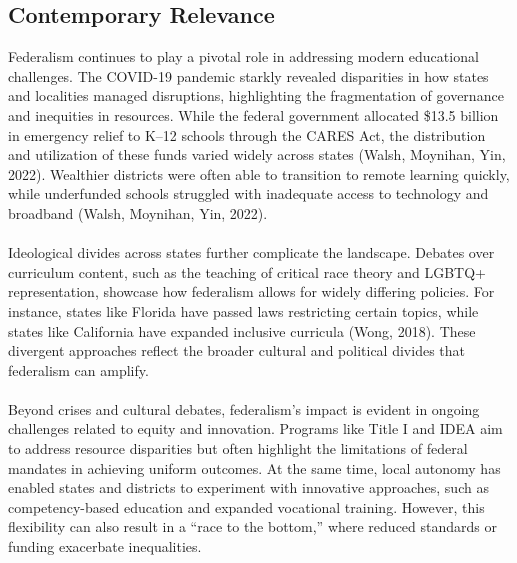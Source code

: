\documentclass[11pt]{extarticle}
\begin{document}
\subsection{Contemporary Relevance}
Federalism continues to play a pivotal role in addressing modern educational challenges. The COVID-19 pandemic starkly revealed disparities in how states and localities managed disruptions, highlighting the fragmentation of governance and inequities in resources. While the federal government allocated \$13.5 billion in emergency relief to K–12 schools through the CARES Act, the distribution and utilization of these funds varied widely across states (Walsh, Moynihan, Yin, 2022). Wealthier districts were often able to transition to remote learning quickly, while underfunded schools struggled with inadequate access to technology and broadband (Walsh, Moynihan, Yin, 2022).\\
\\
Ideological divides across states further complicate the landscape. Debates over curriculum content, such as the teaching of critical race theory and LGBTQ+ representation, showcase how federalism allows for widely differing policies. For instance, states like Florida have passed laws restricting certain topics, while states like California have expanded inclusive curricula (Wong, 2018). These divergent approaches reflect the broader cultural and political divides that federalism can amplify.\\
\\
Beyond crises and cultural debates, federalism’s impact is evident in ongoing challenges related to equity and innovation. Programs like Title I and IDEA aim to address resource disparities but often highlight the limitations of federal mandates in achieving uniform outcomes. At the same time, local autonomy has enabled states and districts to experiment with innovative approaches, such as competency-based education and expanded vocational training. However, this flexibility can also result in a “race to the bottom,” where reduced standards or funding exacerbate inequalities.
\end{document}
